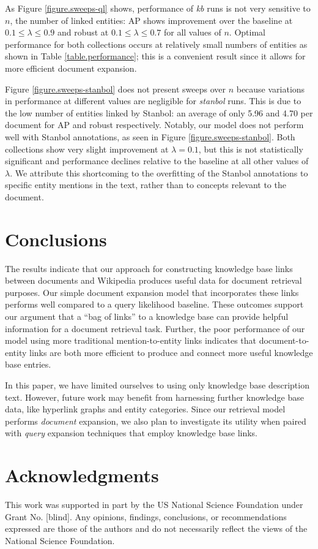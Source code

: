 \documentclass{sig-alternate}
\begin{document}
As Figure \ref{figure.sweeps-ql} shows, performance of \textit{kb} runs is not very sensitive to $n$, the number of linked entities: AP shows improvement over the baseline at $0.1 \leq \lambda \leq 0.9$ and robust at $0.1 \leq \lambda \leq 0.7$ for all values of $n$. Optimal performance for both collections occurs at relatively small numbers of entities as shown in Table \ref{table.performance}; this is a convenient result since it allows for more efficient document expansion.

Figure \ref{figure.sweeps-stanbol} does not present sweeps over $n$ because variations in performance at different values are negligible for \textit{stanbol} runs. This is due to the low number of entities linked by Stanbol: an average of only 5.96 and 4.70 per document for AP and robust respectively. Notably, our model does not perform well with Stanbol annotations, as seen in Figure \ref{figure.sweeps-stanbol}. Both collections show very slight improvement at $\lambda = 0.1$, but this is not statistically significant and performance declines relative to the baseline at all other values of $\lambda$. We attribute this shortcoming to the overfitting of the Stanbol annotations to specific entity mentions in the text, rather than to concepts relevant to the document. 

\section{Conclusions}\label{section.conclusions}

The results indicate that our approach for constructing knowledge base links between documents and Wikipedia produces useful data for document retrieval purposes. Our simple document expansion model that incorporates these links performs well compared to a query likelihood baseline. These outcomes support our argument that a ``bag of links'' to a knowledge base can provide helpful information for a document retrieval task. Further, the poor performance of our model using more traditional mention-to-entity links indicates that document-to-entity links are both more efficient to produce and connect more useful knowledge base entries.

In this paper, we have limited ourselves to using only knowledge base description text. However, future work may benefit from harnessing further knowledge base data, like hyperlink graphs and entity categories. Since our retrieval model performs \textit{document} expansion, we also plan to investigate its utility when paired with \textit{query} expansion techniques that employ knowledge base links.

\section{Acknowledgments}\label{section.acknowledgments}
This work was supported in part by the US National Science Foundation under Grant No. [blind]. Any opinions, findings, conclusions, or recommendations expressed are those of the authors and do not necessarily reflect the views of the National Science Foundation.



  
\end{document}
